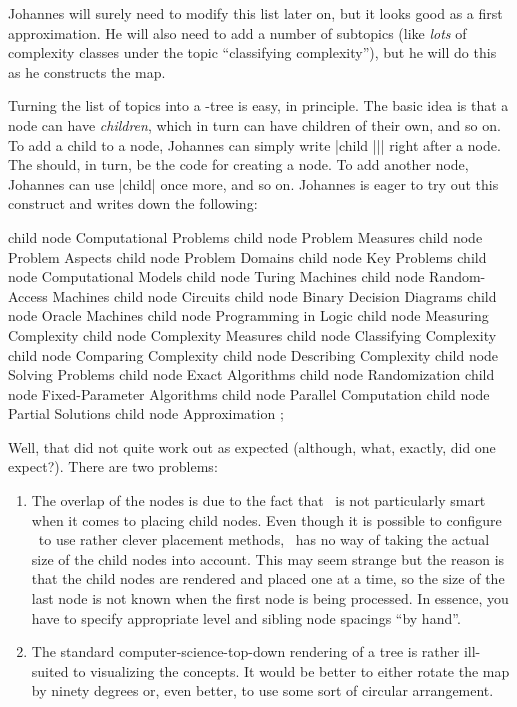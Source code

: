 Johannes will surely need to modify this list later on, but it looks good as a
first approximation. He will also need to add a number of subtopics (like
\emph{lots} of complexity classes under the topic ``classifying complexity''),
but he will do this as he constructs the map.

Turning the list of topics into a \tikzname-tree is easy, in principle. The
basic idea is that a node can have \emph{children}, which in turn can have
children of their own, and so on. To add a child to a node, Johannes can simply
write |child {||}| right after a node. The  should, in
turn, be the code for creating a node. To add another node, Johannes can use
|child| once more, and so on. Johannes is eager to try out this construct and
writes down the following:
%
\begin{codeexample}[]
\tikz
    child { node {Computational Problems}
      child { node {Problem Measures} }
      child { node {Problem Aspects} }
      child { node {Problem Domains} }
      child { node {Key Problems} }
    }
    child { node {Computational Models}
      child { node {Turing Machines} }
      child { node {Random-Access Machines} }
      child { node {Circuits} }
      child { node {Binary Decision Diagrams} }
      child { node {Oracle Machines} }
      child { node {Programming in Logic} }
    }
    child { node {Measuring Complexity}
      child { node {Complexity Measures} }
      child { node {Classifying Complexity} }
      child { node {Comparing Complexity} }
      child { node {Describing Complexity} }
    }
    child { node {Solving Problems}
      child { node {Exact Algorithms} }
      child { node {Randomization} }
      child { node {Fixed-Parameter Algorithms} }
      child { node {Parallel Computation} }
      child { node {Partial Solutions} }
      child { node {Approximation} }
    };
\end{codeexample}

Well, that did not quite work out as expected (although, what, exactly, did one
expect?). There are two problems:
%
\begin{enumerate}
    \item The overlap of the nodes is due to the fact that \tikzname\ is not
        particularly smart when it comes to placing child nodes. Even though
        it is possible to configure \tikzname\ to use rather clever placement
        methods, \tikzname\ has no way of taking the actual size of the child
        nodes into account. This may seem strange but the reason is that the
        child nodes are rendered and placed one at a time, so the size of the
        last node is not known when the first node is being processed. In
        essence, you have to specify appropriate level and sibling node
        spacings ``by hand''.
    \item The standard computer-science-top-down rendering of a tree is
        rather ill-suited to visualizing the concepts. It would be better to
        either rotate the map by ninety degrees or, even better, to use some
        sort of circular arrangement.
\end{enumerate}

